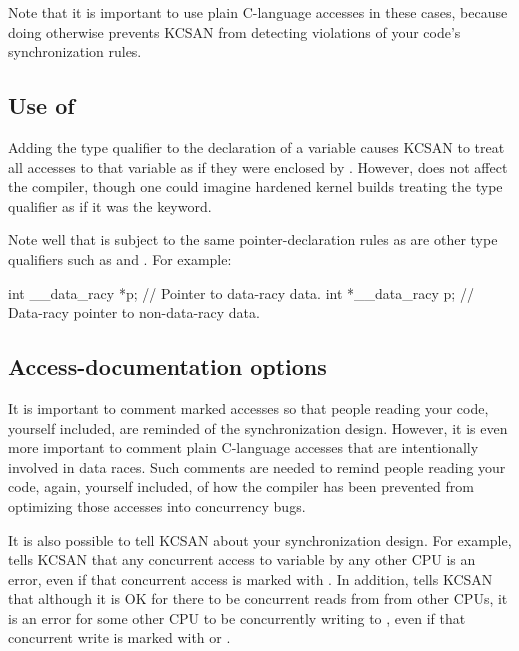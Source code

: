 Note that it is important to use plain C-language accesses in these cases,
because doing otherwise prevents KCSAN from detecting violations of your
code's synchronization rules.


\subsection{Use of }

Adding the  type qualifier to the declaration of a variable
causes KCSAN to treat all accesses to that variable as if they were
enclosed by .
However,  does not affect the compiler, though one could
imagine hardened kernel builds treating the  type qualifier
as if it was the  keyword.

Note well that  is subject to the same pointer-declaration
rules as are other type qualifiers such as  and .
For example:

\begin{VerbatimU}
	int __data_racy *p; // Pointer to data-racy data.
	int *__data_racy p; // Data-racy pointer to non-data-racy data.
\end{VerbatimU}

\subsection{Access-documentation options}

It is important to comment marked accesses so that people reading your
code, yourself included, are reminded of the synchronization design.
However, it is even more important to comment plain C-language accesses
that are intentionally involved in data races.
Such comments are needed to remind people reading your code, again,
yourself included, of how the compiler has been prevented from optimizing
those accesses into concurrency bugs.

It is also possible to tell KCSAN about your synchronization design.
For example,  tells KCSAN that any
concurrent access to variable  by any other CPU is an error, even
if that concurrent access is marked with .
In addition,  tells KCSAN that although
it is OK for there to be concurrent reads from  from other CPUs,
it is an error for some other CPU to be concurrently writing to ,
even if that concurrent write is marked with  or
.

